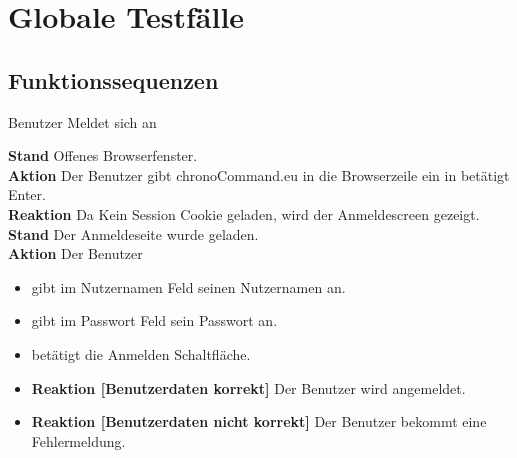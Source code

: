 \section{Globale Testfälle}

\subsection{Funktionssequenzen}
\begin{requirements}
	 Benutzer Meldet sich an
	\begin{requirements}
  			    \textbf{Stand} Offenes Browserfenster. \\
  			    \textbf{Aktion} Der Benutzer gibt chronoCommand.eu in die Browserzeile ein in betätigt Enter. \\
  			    \textbf{Reaktion} Da Kein Session Cookie geladen, wird der Anmeldescreen gezeigt.
  			    \textbf{Stand} Der Anmeldeseite wurde geladen.\\
                \textbf{Aktion} Der Benutzer
                    \begin{itemize}
                        \item gibt im Nutzernamen Feld seinen Nutzernamen an.
                        \item gibt im Passwort Feld sein Passwort an.
                        \item betätigt die Anmelden Schaltfläche.
                    \end{itemize}
                \begin{itemize}
			\item \textbf{Reaktion [Benutzerdaten korrekt]} Der Benutzer wird angemeldet.
			\item \textbf{Reaktion [Benutzerdaten nicht korrekt]} Der Benutzer bekommt eine Fehlermeldung.
                \end{itemize}


\end{requirements}
\end{requirements}
